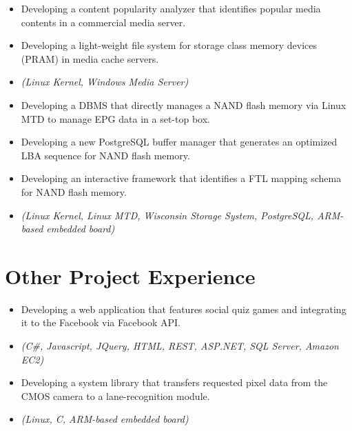 \begin{itemize}
 \item {Developing a content popularity analyzer that identifies
 popular media contents in a commercial media server.}
 \item{Developing a light-weight file system for storage class memory devices (PRAM) in media cache servers.}
 \item{\it\small(Linux Kernel, Windows Media Server)}
\end{itemize}

\begin{itemize}
\item{Developing a DBMS that directly manages a NAND flash memory
	via Linux MTD to manage EPG data in a set-top box.}
\item{Developing a new PostgreSQL buffer manager
         that generates an optimized LBA sequence for NAND flash memory.}
\item{Developing an interactive framework that 
	identifies a FTL mapping schema for NAND flash memory.}
\item{\it\small(Linux Kernel, Linux MTD, Wisconsin Storage System, PostgreSQL,
             ARM-based embedded board)}
\end{itemize}

\section{Other Project Experience}

\begin{itemize}
     \item{Developing a web application that features social quiz games and
	     integrating it to the Facebook via Facebook API.}
     \item{\it\small(C\#, Javascript, JQuery, HTML, REST, ASP.NET, SQL Server, Amazon EC2)}
\end{itemize}

\begin{itemize}
 \item {Developing a system library that transfers requested pixel data from the CMOS camera
	 to a lane-recognition module.}
 \item{\it\small(Linux, C, ARM-based embedded board)}
\end{itemize}

